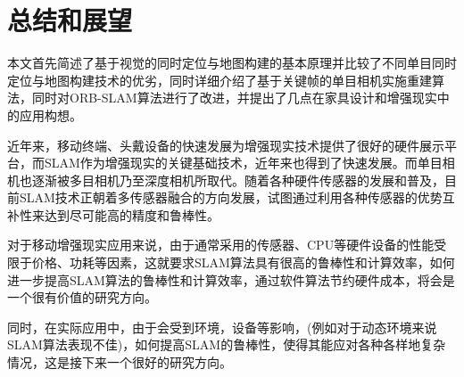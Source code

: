 \chapter{总结和展望}
本文首先简述了基于视觉的同时定位与地图构建的基本原理并比较了不同单目同时定位与地图构建技术的优劣，同时详细介绍了基于关键帧的单目相机实施重建算法，同时对ORB-SLAM算法进行了改进，并提出了几点在家具设计和增强现实中的应用构想。

近年来，移动终端、头戴设备的快速发展为增强现实技术提供了很好的硬件展示平台，而SLAM作为增强现实的关键基础技术，近年来也得到了快速发展。而单目相机也逐渐被多目相机乃至深度相机所取代。随着各种硬件传感器的发展和普及，目前SLAM技术正朝着多传感器融合的方向发展，试图通过利用各种传感器的优势互补性来达到尽可能高的精度和鲁棒性。

对于移动增强现实应用来说，由于通常采用的传感器、CPU等硬件设备的性能受限于价格、功耗等因素，这就要求SLAM算法具有很高的鲁棒性和计算效率，如何进一步提高SLAM算法的鲁棒性和计算效率，通过软件算法节约硬件成本，将会是一个很有价值的研究方向。

同时，在实际应用中，由于会受到环境，设备等影响，(例如对于动态环境来说SLAM算法表现不佳)，如何提高SLAM的鲁棒性，使得其能应对各种各样地复杂情况，这是接下来一个很好的研究方向。